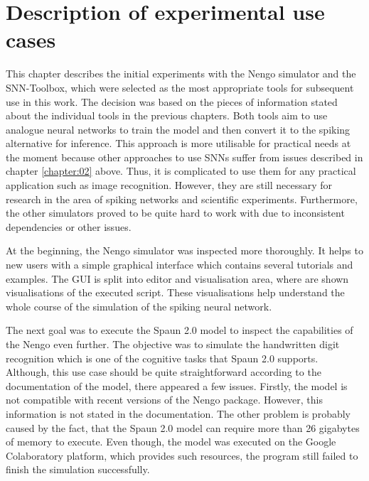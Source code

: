 \chapter{Description of experimental use cases} \label{chapter:05}

This chapter describes the initial experiments with the Nengo simulator and the SNN-Toolbox, which were selected as the most appropriate tools for subsequent use in this work. The decision was based on the pieces of information stated about the individual tools in the previous chapters. Both tools aim to use analogue neural networks to train the model and then convert it to the spiking alternative for inference. This approach is more utilisable for practical needs at the moment because other approaches to use SNNs suffer from issues described in chapter \ref{chapter:02} above. Thus, it is complicated to use them for any practical application such as image recognition. However, they are still necessary for research in the area of spiking networks and scientific experiments. Furthermore, the other simulators proved to be quite hard to work with due to inconsistent dependencies or other issues. \par
At the beginning, the Nengo simulator was inspected more thoroughly. It helps to new users with a simple graphical interface which contains several tutorials and examples. The GUI is split into editor and visualisation area, where are shown visualisations of the executed script. These visualisations help understand the whole course of the simulation of the spiking neural network. \par
The next goal was to execute the Spaun 2.0 model to inspect the capabilities of the Nengo even further. The objective was to simulate the handwritten digit recognition which is one of the cognitive tasks that Spaun 2.0 supports. Although, this use case should be quite straightforward according to the documentation of the model, there appeared a few issues. Firstly, the model is not compatible with recent versions of the Nengo package. However, this information is not stated in the documentation. The other problem is probably caused by the fact, that the Spaun 2.0 model can require more than 26 gigabytes of memory to execute. Even though, the model was executed on the Google Colaboratory platform, which provides such resources, the program still failed to finish the simulation successfully.